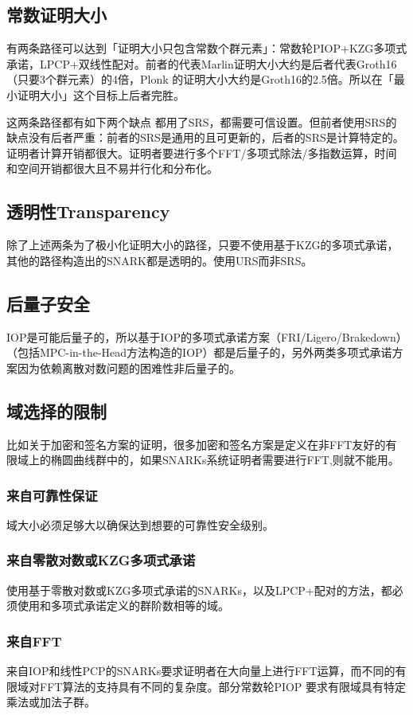 \documentclass[runningheads]{llncs}
\begin{document}
\subsection{常数证明大小}
有两条路径可以达到「证明大小只包含常数个群元素」：常数轮PIOP+KZG多项式承诺，LPCP+双线性配对。前者的代表Marlin证明大小大约是后者代表Groth16（只要3个群元素）的4倍，Plonk 的证明大小大约是Groth16的2.5倍。所以在「最小证明大小」这个目标上后者完胜。

这两条路径都有如下两个缺点
都用了SRS，都需要可信设置。但前者使用SRS的缺点没有后者严重：前者的SRS是通用的且可更新的，后者的SRS是计算特定的。
证明者计算开销都很大。证明者要进行多个FFT/多项式除法/多指数运算，时间和空间开销都很大且不易并行化和分布化。
\subsection{透明性Transparency}
除了上述两条为了极小化证明大小的路径，只要不使用基于KZG的多项式承诺，其他的路径构造出的SNARK都是透明的。使用URS而非SRS。
\subsection{后量子安全}
IOP是可能后量子的，所以基于IOP的多项式承诺方案（FRI/Ligero/Brakedown）（包括MPC-in-the-Head方法构造的IOP）都是后量子的，另外两类多项式承诺方案因为依赖离散对数问题的困难性非后量子的。

\subsection{域选择的限制}
比如关于加密和签名方案的证明，很多加密和签名方案是定义在非FFT友好的有限域上的椭圆曲线群中的，如果SNARKs系统证明者需要进行FFT,则就不能用。

\subsubsection*{来自可靠性保证}
域大小必须足够大以确保达到想要的可靠性安全级别。

\subsubsection*{来自零散对数或KZG多项式承诺} 使用基于零散对数或KZG多项式承诺的SNARKs，以及LPCP+配对的方法，都必须使用和多项式承诺定义的群阶数相等的域。

\subsubsection*{来自FFT} 来自IOP和线性PCP的SNARKs要求证明者在大向量上进行FFT运算，而不同的有限域对FFT算法的支持具有不同的复杂度。部分常数轮PIOP \cite{CHM20,GWC19}要求有限域具有特定乘法或加法子群。
\end{document}
